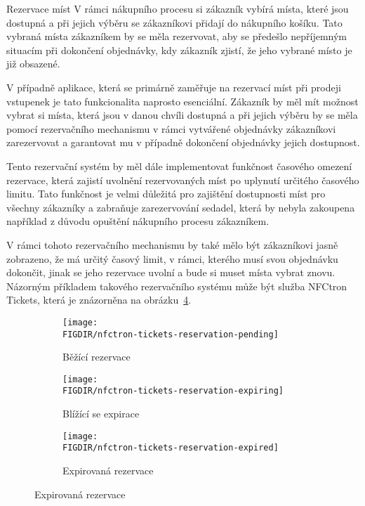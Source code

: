 \begin{subsection}{Rezervace míst}
    \label{subsec:identifikace-nakupni-kosik-rezervace}
    V rámci nákupního procesu si zákazník vybírá místa, které jsou dostupná a při jejich výběru se zákazníkovi přidají do nákupního košíku.
    Tato vybraná místa zákazníkem by se měla rezervovat, aby se předešlo nepříjemným situacím při dokončení objednávky, kdy zákazník zjistí, že jeho vybrané místo je již obsazené.

    V případně aplikace, která se primárně zaměřuje na rezervací míst při prodeji vstupenek je tato funkcionalita naprosto esenciální.
    Zákazník by měl mít možnost vybrat si místa, která jsou v danou chvíli dostupná a při jejich výběru by se měla pomocí rezervačního mechanismu v rámci vytvářené objednávky zákazníkovi zarezervovat a garantovat mu v případně dokončení objednávky jejich dostupnost.

    Tento rezervační systém by měl dále implementovat funkčnost časového omezení rezervace, která zajistí uvolnění rezervovaných míst po uplynutí určitého časového limitu.
    Tato funkčnost je velmi důležitá pro zajištění dostupnosti míst pro všechny zákazníky a zabraňuje zarezervování sedadel, která by nebyla zakoupena například z důvodu opuštění nákupního procesu zákazníkem.

    V rámci tohoto rezervačního mechanismu by také mělo být zákazníkovi jasně zobrazeno, že má určitý časový limit, v rámci, kterého musí svou objednávku dokončit, jinak se jeho rezervace uvolní a bude si muset místa vybrat znovu.
    Názorným příkladem takového rezervačního systému může být služba NFCtron Tickets, která je znázorněna na obrázku~\ref{fig:nfctron-tickets-reservation}.

    \begin{figure}[H]
        \centering
        \caption{Rezervační mechanismus služby NFCtron Tickets na zkušební akci}
        \begin{subfigure}{0.3\textwidth}
            \texttt{[image: \\FIGDIR/nfctron-tickets-reservation-pending]}
            \caption{Běžící rezervace}
            \label{fig:nfctron-tickets-reservation-pending}
        \end{subfigure}
        \hfill
        \begin{subfigure}{0.3\textwidth}
            \texttt{[image: \\FIGDIR/nfctron-tickets-reservation-expiring]}
            \caption{Blížící se expirace}
            \label{fig:nfctron-tickets-reservation-expiring}
        \end{subfigure}
        \hfill
        \begin{subfigure}{0.3\textwidth}
            \texttt{[image: \\FIGDIR/nfctron-tickets-reservation-expired]}
            \caption{Expirovaná rezervace}
            \label{fig:nfctron-tickets-reservation-expired}
        \end{subfigure}
        \label{fig:nfctron-tickets-reservation}
    \end{figure}
\end{subsection}
